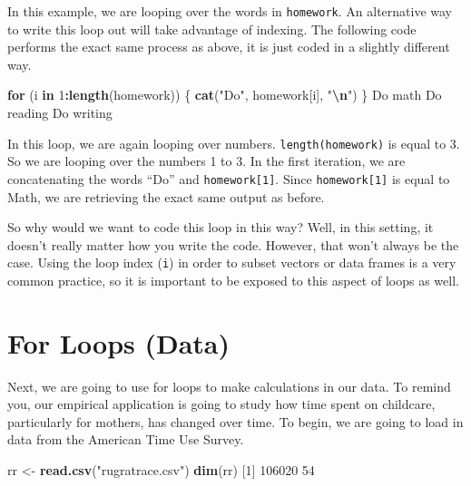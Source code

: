 \documentclass[
]{book}
\newenvironment{Shaded}{\begin{snugshade}}{\end{snugshade}}
\newcommand{\ControlFlowTok}[1]{\textcolor[rgb]{0.13,0.29,0.53}{\textbf{#1}}}
\newcommand{\DecValTok}[1]{\textcolor[rgb]{0.00,0.00,0.81}{#1}}
\newcommand{\FunctionTok}[1]{\textcolor[rgb]{0.13,0.29,0.53}{\textbf{#1}}}
\newcommand{\NormalTok}[1]{#1}
\newcommand{\OtherTok}[1]{\textcolor[rgb]{0.56,0.35,0.01}{#1}}
\newcommand{\SpecialCharTok}[1]{\textcolor[rgb]{0.81,0.36,0.00}{\textbf{#1}}}
\newcommand{\StringTok}[1]{\textcolor[rgb]{0.31,0.60,0.02}{#1}}
\begin{document}
In this example, we are looping over the words in \texttt{homework}. An alternative way to write this loop out will take advantage of indexing. The following code performs the exact same process as above, it is just coded in a slightly different way.

\begin{Shaded}
\begin{Highlighting}[]
\ControlFlowTok{for}\NormalTok{ (i }\ControlFlowTok{in} \DecValTok{1}\SpecialCharTok{:}\FunctionTok{length}\NormalTok{(homework)) \{}
  \FunctionTok{cat}\NormalTok{(}\StringTok{"Do"}\NormalTok{, homework[i], }\StringTok{"}\SpecialCharTok{\textbackslash{}n}\StringTok{"}\NormalTok{)}
\NormalTok{\}}
\NormalTok{Do math }
\NormalTok{Do reading }
\NormalTok{Do writing }
\end{Highlighting}
\end{Shaded}

In this loop, we are again looping over numbers. \texttt{length(homework)} is equal to 3. So we are looping over the numbers 1 to 3. In the first iteration, we are concatenating the words ``Do'' and \texttt{homework{[}1{]}}. Since \texttt{homework{[}1{]}} is equal to Math, we are retrieving the exact same output as before.

So why would we want to code this loop in this way? Well, in this setting, it doesn't really matter how you write the code. However, that won't always be the case. Using the loop index (\texttt{i}) in order to subset vectors or data frames is a very common practice, so it is important to be exposed to this aspect of loops as well.

\section{For Loops (Data)}\label{for-loops-data}

Next, we are going to use for loops to make calculations in our data. To remind you, our empirical application is going to study how time spent on childcare, particularly for mothers, has changed over time. To begin, we are going to load in data from the American Time Use Survey.

\begin{Shaded}
\begin{Highlighting}[]
\NormalTok{rr }\OtherTok{\textless{}{-}} \FunctionTok{read.csv}\NormalTok{(}\StringTok{"rugratrace.csv"}\NormalTok{)}
\FunctionTok{dim}\NormalTok{(rr)}
\NormalTok{[}\DecValTok{1}\NormalTok{] }\DecValTok{106020}     \DecValTok{54}
\end{Highlighting}
\end{Shaded}
\end{document}
